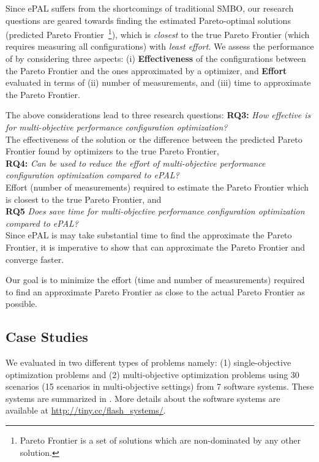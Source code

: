 Since ePAL suffers from the shortcomings of traditional SMBO, our research questions are geared towards finding the estimated Pareto-optimal solutions (predicted Pareto Frontier~\footnote{Pareto Frontier is a set of solutions which are non-dominated by any other solution.}), which is \textit{closest} to the true Pareto Frontier (which requires measuring all configurations) with \textit{least effort}.  We assess the performance of \flash by considering three aspects: (i) \textbf{Effectiveness} of the configurations between the Pareto Frontier and the ones approximated by a optimizer, and \textbf{Effort} evaluated in terms of (ii) number of measurements, and (iii) time to approximate the Pareto Frontier.

\noindent The above considerations lead to three research questions:
\textbf{RQ3:} \textit{How effective is \flash for multi-objective performance configuration optimization?}\\
The effectiveness of the solution or the difference between the predicted Pareto Frontier found by optimizers to the true Pareto Frontier,\\
\textbf{RQ4:} \textit{Can \flash be used to reduce the effort of multi-objective performance configuration optimization compared to ePAL?}\\
Effort  (number of  measurements)  required to estimate the Pareto Frontier which is closest to the true Pareto Frontier, and\\
\textbf{RQ5} \textit{Does \flash save time for multi-objective performance configuration optimization compared to ePAL? }\\
Since ePAL is may take substantial time to find the approximate the Pareto Frontier, it is imperative to show that \flash can approximate the Pareto Frontier and converge faster.

Our goal is to minimize the effort (time and number of measurements) required to find an approximate Pareto Frontier as close to the actual Pareto Frontier as possible.

\subsection{Case Studies}

We evaluated \flash in two different types of problems namely: (1) single-objective optimization problems and (2)  multi-objective optimization problems using 30 scenarios (15 scenarios in multi-objective settings) from 7 software systems. These systems are summarized in .
More details about the software systems are available at \url{http://tiny.cc/flash_systems/}.

